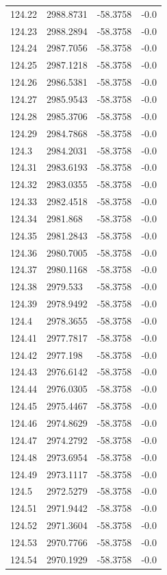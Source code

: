 \begin{table}[H]
\begin{tabular}{llll}
124.22 & 2988.8731 & -58.3758 & -0.0 \\
124.23 & 2988.2894 & -58.3758 & -0.0 \\
124.24 & 2987.7056 & -58.3758 & -0.0 \\
124.25 & 2987.1218 & -58.3758 & -0.0 \\
124.26 & 2986.5381 & -58.3758 & -0.0 \\
124.27 & 2985.9543 & -58.3758 & -0.0 \\
124.28 & 2985.3706 & -58.3758 & -0.0 \\
124.29 & 2984.7868 & -58.3758 & -0.0 \\
124.3 & 2984.2031 & -58.3758 & -0.0 \\
124.31 & 2983.6193 & -58.3758 & -0.0 \\
124.32 & 2983.0355 & -58.3758 & -0.0 \\
124.33 & 2982.4518 & -58.3758 & -0.0 \\
124.34 & 2981.868 & -58.3758 & -0.0 \\
124.35 & 2981.2843 & -58.3758 & -0.0 \\
124.36 & 2980.7005 & -58.3758 & -0.0 \\
124.37 & 2980.1168 & -58.3758 & -0.0 \\
124.38 & 2979.533 & -58.3758 & -0.0 \\
124.39 & 2978.9492 & -58.3758 & -0.0 \\
124.4 & 2978.3655 & -58.3758 & -0.0 \\
124.41 & 2977.7817 & -58.3758 & -0.0 \\
124.42 & 2977.198 & -58.3758 & -0.0 \\
124.43 & 2976.6142 & -58.3758 & -0.0 \\
124.44 & 2976.0305 & -58.3758 & -0.0 \\
124.45 & 2975.4467 & -58.3758 & -0.0 \\
124.46 & 2974.8629 & -58.3758 & -0.0 \\
124.47 & 2974.2792 & -58.3758 & -0.0 \\
124.48 & 2973.6954 & -58.3758 & -0.0 \\
124.49 & 2973.1117 & -58.3758 & -0.0 \\
124.5 & 2972.5279 & -58.3758 & -0.0 \\
124.51 & 2971.9442 & -58.3758 & -0.0 \\
124.52 & 2971.3604 & -58.3758 & -0.0 \\
124.53 & 2970.7766 & -58.3758 & -0.0 \\
124.54 & 2970.1929 & -58.3758 & -0.0 \\

\end{tabular}
\end{table}
